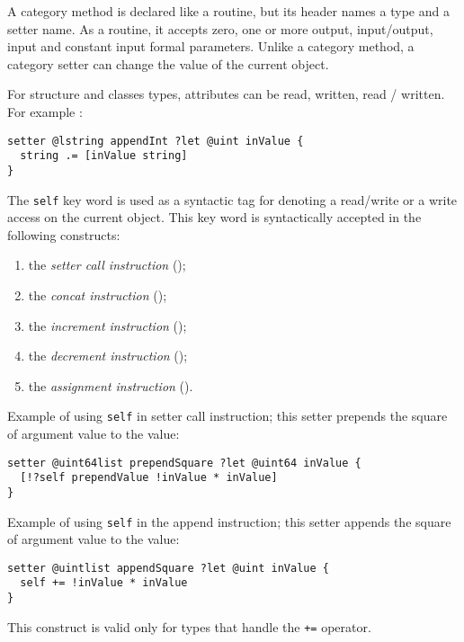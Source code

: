 
A category method is declared like a routine, but its header names a type and a setter name. As a routine, it accepts zero, one or more output, input/output, input and constant input formal parameters. Unlike a category method, a category setter can change the value of the current object.

For structure and classes types, attributes can be read, written, read / written. For example :
\begin{lstlisting}[language=galgas]
setter @lstring appendInt ?let @uint inValue {
  string .= [inValue string]
}
\end{lstlisting}


The \lstinline[language=galgas]!self! key word is used as a syntactic tag for denoting a read/write or a write access on the current object. This key word is syntactically accepted in the following constructs:
\begin{enumerate}
\item the \emph{setter call instruction} ();
\item the \emph{concat instruction} ();
\item the \emph{increment instruction} ();
\item the \emph{decrement instruction} ();
\item the \emph{assignment instruction} ().
\end{enumerate}

Example of using \lstinline[language=galgas]!self! in setter call instruction; this setter prepends the square of argument value to the  value:
\begin{lstlisting}[language=galgas]
setter @uint64list prependSquare ?let @uint64 inValue {
  [!?self prependValue !inValue * inValue]
}
\end{lstlisting}


Example of using \lstinline[language=galgas]!self! in the append instruction; this setter appends the square of argument value to the  value:
\begin{lstlisting}[language=galgas]
setter @uintlist appendSquare ?let @uint inValue {
  self += !inValue * inValue
}
\end{lstlisting}
This construct is valid only for types that handle the \lstinline[language=galgas]!+=! operator.


